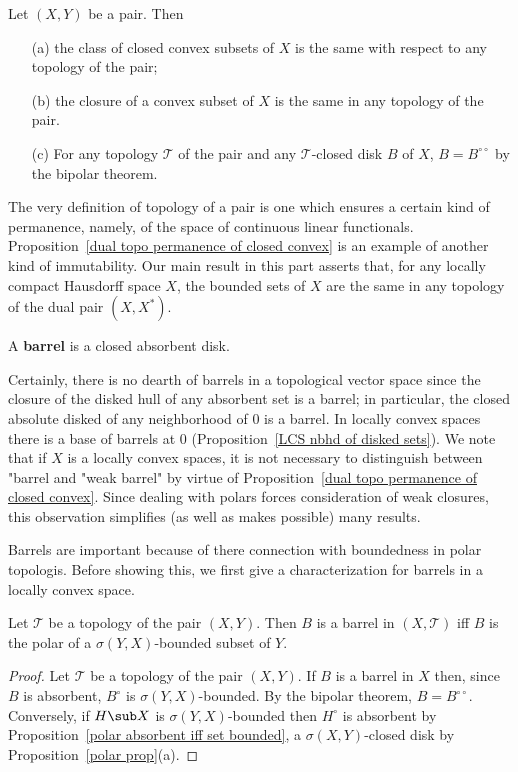 \begin{proposition}\label{dual topo permanence of closed convex}
Let $(X,Y)$ be a pair. Then
\begin{itemize}
\item[(a)] the class of closed convex subsets of $X$ is the same with respect to any topology of the pair;
\item[(b)] the closure of a convex subset of $X$ is the same in any topology of the pair.
\item[(c)] For any topology $\mathcal{T}$ of the pair and any $\mathcal{T}$-closed disk $B$ of $X$, $B=B^{\circ\circ}$ by the bipolar theorem.
\end{itemize}
\end{proposition}
The very definition of topology of a pair is one which ensures a certain kind of permanence, namely, of the space of continuous linear functionals. Proposition~\ref{dual topo permanence of closed convex} is an example of another kind of immutability. Our main result in this part asserts that, for any locally compact Hausdorff space $X$, the bounded sets of $X$ are the same in any topology of the dual pair $(X,X^*)$.
\begin{definition}
A \textbf{barrel} is a closed absorbent disk.
\end{definition}
Certainly, there is no dearth of barrels in a topological vector space since the closure of the disked hull of any absorbent set is a barrel; in particular, the closed absolute disked of any neighborhood of $0$ is a barrel. In locally convex spaces there is a base of barrels at $0$ (Proposition~\ref{LCS nbhd of disked sets}). We note that if $X$ is a locally convex spaces, it is not necessary to distinguish between "barrel and "weak barrel" by virtue of Proposition~\ref{dual topo permanence of closed convex}. Since dealing with polars forces consideration of weak closures, this observation simplifies (as well as makes possible) many results.\par
Barrels are important because of there connection with boundedness in polar topologis. Before showing this, we first give a characterization for barrels in a locally convex space.
\begin{proposition}\label{dual topo barrel iff polar of weak bounded}
Let $\mathcal{T}$ be a topology of the pair $(X,Y)$. Then $B$ is a barrel in $(X,\mathcal{T})$ iff $B$ is the polar of a $\sigma(Y,X)$-bounded subset of $Y$.
\end{proposition}
\begin{proof}
Let $\mathcal{T}$ be a topology of the pair $(X,Y)$. If $B$ is a barrel in $X$ then, since $B$ is absorbent, $B^\circ$ is $\sigma(Y,X)$-bounded. By the bipolar theorem, $B=B^{\circ\circ}$. Conversely, if $H\sub X$ is $\sigma(Y,X)$-bounded then $H^\circ$ is absorbent by Proposition~\ref{polar absorbent iff set bounded}, a $\sigma(X,Y)$-closed disk by Proposition~\ref{polar prop}(a).
\end{proof}
